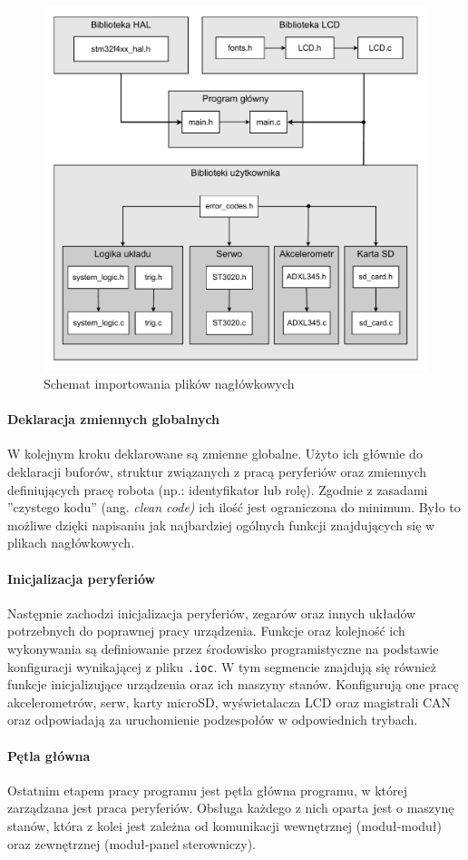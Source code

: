 \begin{figure}[ht!]
    \centering
    \includegraphics[width=0.7\linewidth]{rysunki/main_program/header_includes.pdf}
    \caption{Schemat importowania plików nagłówkowych}
    \label{fig: header_include}
\end{figure}

\paragraph*{Deklaracja zmiennych globalnych} W kolejnym kroku deklarowane są zmienne globalne. Użyto ich głównie do deklaracji buforów, struktur związanych z pracą peryferiów oraz zmiennych definiujących pracę robota (np.: identyfikator lub rolę). Zgodnie z zasadami ''czystego kodu'' (ang. \textit{clean code)} ich ilość jest ograniczona do minimum. Było to możliwe dzięki napisaniu jak najbardziej ogólnych funkcji znajdujących się w plikach nagłówkowych.

\paragraph*{Inicjalizacja peryferiów} Następnie zachodzi inicjalizacja peryferiów, zegarów oraz innych układów potrzebnych do poprawnej pracy urządzenia. Funkcje oraz kolejność ich wykonywania są definiowanie przez środowisko programistyczne na podstawie konfiguracji wynikającej z pliku \texttt{.ioc}. W tym segmencie znajdują się również funkcje inicjalizujące urządzenia oraz ich maszyny stanów. Konfigurują one pracę akcelerometrów, serw, karty microSD, wyświetalacza LCD oraz magistrali CAN oraz odpowiadają za uruchomienie podzespołów w odpowiednich trybach. 

\paragraph*{Pętla główna} Ostatnim etapem pracy programu jest pętla główna programu, w której zarządzana jest praca peryferiów. Obsługa każdego z nich oparta jest o maszynę stanów, która z kolei jest zależna od komunikacji wewnętrznej (moduł-moduł) oraz zewnętrznej (moduł-panel sterowniczy). 

